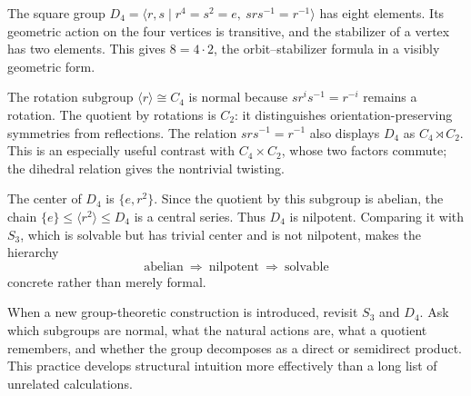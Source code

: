 The square group \(D_4=\langle r,s\mid r^4=s^2=e,\ srs^{-1}=r^{-1}\rangle\)
has eight elements.  Its geometric action on the four vertices is transitive,
and the stabilizer of a vertex has two elements.  This gives \(8=4\cdot2\),
the orbit--stabilizer formula in a visibly geometric form.

The rotation subgroup \(\langle r\rangle\cong C_4\) is normal because
\(s r^i s^{-1}=r^{-i}\) remains a rotation.  The quotient by rotations is
\(C_2\): it distinguishes orientation-preserving symmetries from reflections.
The relation \(srs^{-1}=r^{-1}\) also displays \(D_4\) as
\(C_4\rtimes C_2\).  This is an especially useful contrast with
\(C_4\times C_2\), whose two factors commute; the dihedral relation gives the
nontrivial twisting.

The center of \(D_4\) is \(\{e,r^2\}\). Since the quotient by this subgroup
is abelian, the chain \(\{e\}\leq\langle r^2\rangle\leq D_4\) is a central series.
Thus \(D_4\) is nilpotent.  Comparing it with \(S_3\), which is solvable but
has trivial center and is not nilpotent, makes the hierarchy
\[\text{abelian}\ \Longrightarrow\ \text{nilpotent}\ \Longrightarrow\
\text{solvable}\]
concrete rather than merely formal.

\begin{remark}
When a new group-theoretic construction is introduced, revisit \(S_3\) and
\(D_4\).  Ask which subgroups are normal, what the natural actions are, what a
quotient remembers, and whether the group decomposes as a direct or semidirect
product.  This practice develops structural intuition more effectively than a
long list of unrelated calculations.
\end{remark}

